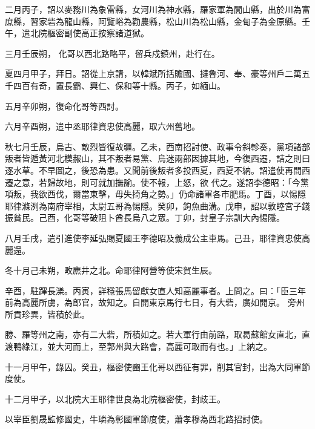 \begin{pinyinscope}
 二月丙子，詔以麥務川為象雷縣，女河川為神水縣，羅家軍為閭山縣，出於川為富庶縣，習家砦為龍山縣，阿覽峪為勸農縣，松山川為松山縣，金甸子為金原縣。壬午，遣北院樞密副使高正按察諸道獄。



 三月壬辰朔，
 化哥以西北路略平，留兵戍鎮州，赴行在。



 夏四月甲子，拜日。詔從上京請，以韓斌所括贍國、撻魯河、奉、豪等州戶二萬五千四百有奇，置長霸、興仁、保和等十縣。丙子，如緬山。



 五月辛卯朔，復命化哥等西討。



 六月辛酉朔，遣中丞耶律資忠使高麗，取六州舊地。



 秋七月壬辰，烏古、敵烈皆復故疆。乙未，西南招討使、政事令斜軫奏，黨項諸部叛者皆遁黃河北模赧山，其不叛者易黨、烏迷兩部因據其地，今復西遷，詰之則曰逐水草。不早圖之，後恐為患。又聞前後叛者多投西夏，西夏不納。詔遣使再間西遷之意，若歸故地，則可就加撫諭。使不報，上怒，欲
 代之。遂詔李德昭：「今黨項叛，我欲西伐，爾當東擊，毋失掎角之勢。」仍命諸軍各市肥馬。丁酉，以惕隱耶律滌洌為南府宰相，太尉五哥為惕隱。癸卯，鉤魚曲溝。戊申，詔以敦睦宮子錢振貧民。己酉，化哥等破阻卜酋長烏八之眾。丁卯，封皇子宗訓大內惕隱。



 八月壬戌，遣引進使李延弘賜夏國王李德昭及義成公主車馬。己丑，耶律資忠使高麗還。



 冬十月己未朔，畋麃井之北。命耶律阿營等使宋賀生辰。



 辛酉，駐蹕長濼。丙寅，詳穩張馬留獻女直人知高麗事者。上問之。曰：「臣三年前為高麗所虜，為郎官，故知之。自開東京馬行七日，有大砦，廣如開京。
 旁州所貢珍異，皆積於此。



 勝、羅等州之南，亦有二大砦，所積如之。若大軍行由前路，取曷蘇館女直北，直渡鴨綠江，並大河而上，至郭州與大路會，高麗可取而有也。」上納之。



 十一月甲午，錄囚。癸丑，樞密使豳王化哥以西征有罪，削其官封，出為大同軍節度使。



 十二月甲子，以北院大王耶律世良為北院樞密使，封歧王。



 以宰臣劉晟監修國史，牛璘為彰國軍節度使，蕭孝穆為西北路招討使。




\end{pinyinscope}
